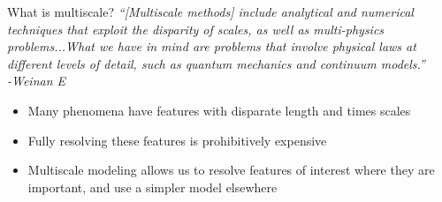 \documentclass{beamer}
\begin{document}
	\begin{frame}[t]{What is multiscale?}
			\em``[Multiscale methods] include analytical and numerical techniques that exploit the disparity of scales, as well as multi-physics problems...What we have in mind are problems that involve physical laws at different levels of detail, such as quantum mechanics and continuum models.''\\
		\normalfont\hfill-Weinan E \\
		\vspace{0.5cm}
		\begin{itemize}
			\item  Many phenomena have features with disparate length and times scales
			\vspace{0.3em}
			\item  Fully resolving these features is prohibitively expensive
			\vspace{0.3em}
			\item  Multiscale modeling allows us to resolve features of interest where they are important, and use a simpler model elsewhere
		\end{itemize}
	\end{frame}
	
\end{document}
